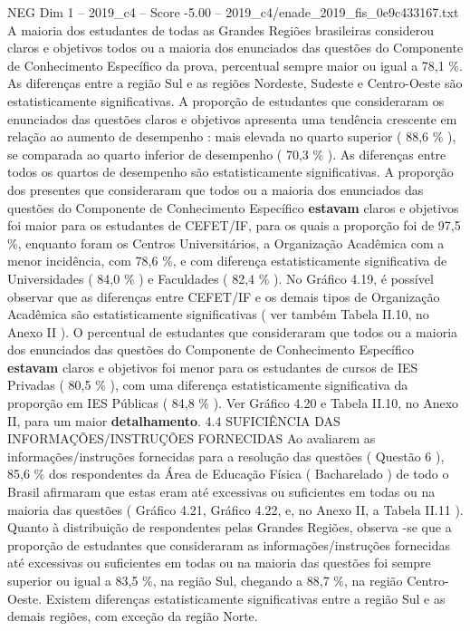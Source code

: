 \begin{textsample}{NEG Dim 1 – 2019\_c4 – Score -5.00 – 2019\_c4/enade\_2019\_fis\_0e9c433167.txt}
A maioria dos estudantes de todas as Grandes Regiões brasileiras considerou claros e objetivos todos ou a maioria dos enunciados das questões do Componente de Conhecimento Específico da prova, percentual sempre maior ou igual a 78,1 \%.
As diferenças entre a região Sul e as regiões Nordeste, Sudeste e Centro-Oeste são estatisticamente significativas.
A proporção de estudantes que consideraram os enunciados das questões claros e objetivos apresenta uma tendência crescente em relação ao aumento de desempenho : mais elevada no quarto superior ( 88,6 \% ), se comparada ao quarto inferior de desempenho ( 70,3 \% ).
As diferenças entre todos os quartos de desempenho são estatisticamente significativas.
A proporção dos presentes que consideraram que todos ou a maioria dos enunciados das questões do Componente de Conhecimento Específico \textbf{estavam} claros e objetivos foi maior para os estudantes de CEFET/IF, para os quais a proporção foi de 97,5 \%, enquanto foram os Centros Universitários, a Organização Acadêmica com a menor incidência, com 78,6 \%, e com diferença estatisticamente significativa de Universidades ( 84,0 \% ) e Faculdades ( 82,4 \% ).
No Gráfico 4.19, é possível observar que as diferenças entre CEFET/IF e os demais tipos de Organização Acadêmica são estatisticamente significativas ( ver também Tabela II.10, no Anexo II ).
O percentual de estudantes que consideraram que todos ou a maioria dos enunciados das questões do Componente de Conhecimento Específico \textbf{estavam} claros e objetivos foi menor para os estudantes de cursos de IES Privadas ( 80,5 \% ), com uma diferença estatisticamente significativa da proporção em IES Públicas ( 84,8 \% ).
Ver Gráfico 4.20 e Tabela II.10, no Anexo II, para um maior \textbf{detalhamento}. 4.4 SUFICIÊNCIA DAS INFORMAÇÕES/INSTRUÇÕES FORNECIDAS Ao avaliarem as informações/instruções fornecidas para a resolução das questões ( Questão 6 ), 85,6 \% dos respondentes da Área de Educação Física ( Bacharelado ) de todo o Brasil afirmaram que estas eram até excessivas ou suficientes em todas ou na maioria das questões ( Gráfico 4.21, Gráfico 4.22, e, no Anexo II, a Tabela II.11 ).
Quanto à distribuição de respondentes pelas Grandes Regiões, observa -se que a proporção de estudantes que consideraram as informações/instruções fornecidas até excessivas ou suficientes em todas ou na maioria das questões foi sempre superior ou igual a 83,5 \%, na região Sul, chegando a 88,7 \%, na região Centro-Oeste.
Existem diferenças estatisticamente significativas entre a região Sul e as demais regiões, com exceção da região Norte.

\end{textsample}
